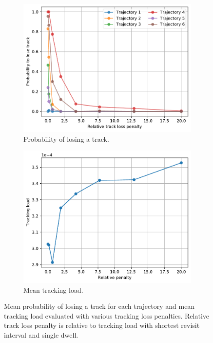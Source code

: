 \documentclass[english, 12pt, a4paper, elec, utf8, a-1b, online]{aaltothesis}
\begin{document}
\begin{figure}[tb]
    \centering
    \begin{subfigure}[b]{0.45\textwidth}
        \includegraphics[width=\linewidth]{figures/benchmark/Simulations/plt_agent.pdf}
        \caption{Probability of losing a track.}
        \label{fig:penalty_plt}
    \end{subfigure}
    \hfill
    \begin{subfigure}[b]{0.45\textwidth}
        \includegraphics[width=\linewidth]{figures/benchmark/Training/tracking_load_agent.pdf}
        \caption{Mean tracking load.}
        \label{fig:penalty_load}
    \end{subfigure}
    \caption{Mean probability of losing a track for each trajectory and mean tracking load evaluated  with various tracking loss penalties. Relative track loss penalty is relative to tracking load with shortest revisit interval and single dwell.}
    \label{fig:penalty_comparison}
\end{figure}
\end{document}
